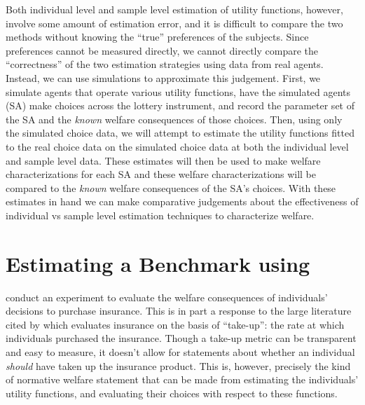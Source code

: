 \documentclass[../main.tex]{subfiles}
\begin{document}
\addtocounter{footnote}{-1}

Both individual level and sample level estimation of utility functions, however, involve some amount of estimation error, and it is difficult to compare the two methods without knowing the \enquote{true} preferences of the subjects.
Since preferences cannot be measured directly, we cannot directly compare the \enquote{correctness} of the two estimation strategies using data from real agents.
Instead, we can use simulations to approximate this judgement.
First, we simulate agents that operate various utility functions, have the simulated agents (SA) make choices across the \textcite{Harrison2015} lottery instrument, and record the parameter set of the SA and the \textit{known} welfare consequences of those choices.
Then, using only the simulated choice data, we will attempt to estimate the utility functions fitted to the real choice data on the simulated choice data at both the individual level and sample level data.
These estimates will then be used to make welfare characterizations for each SA and these welfare characterizations will be compared to the \textit{known} welfare consequences of the SA's choices.
With these estimates in hand we can make comparative judgements about the effectiveness of individual vs sample level estimation techniques to characterize welfare.

\section{Estimating a Benchmark using \texorpdfstring{\textcite{Harrison2015}}{Harrison and Ng (2015)}}

\textcite{Harrison2015} conduct an experiment to evaluate the welfare consequences of individuals' decisions to purchase insurance.
This is in part a response to the large literature cited by \textcite[1]{Harrison2015} which evaluates insurance on the basis of \enquote{take-up}: the rate at which individuals purchased the insurance.
Though a take-up metric can be transparent and easy to measure, it doesn't allow for statements about whether an individual \textit{should} have taken up the insurance product.
This is, however, precisely the kind of normative welfare statement that can be made from estimating the individuals' utility functions, and evaluating their choices with respect to these functions.
\end{document}
